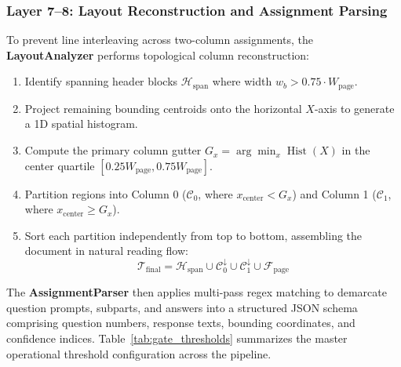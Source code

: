 \documentclass[journal]{IEEEtran}
\begin{document}
\subsubsection{Layer 7--8: Layout Reconstruction and Assignment Parsing}
To prevent line interleaving across two-column assignments, the \textbf{LayoutAnalyzer} performs topological column reconstruction:
\begin{enumerate}
    \item Identify spanning header blocks $\mathcal{H}_{\text{span}}$ where width $w_b > 0.75 \cdot W_{\text{page}}$.
    \item Project remaining bounding centroids onto the horizontal $X$-axis to generate a 1D spatial histogram.
    \item Compute the primary column gutter $G_x = \arg\min_x \operatorname{Hist}(X)$ in the center quartile $[0.25 W_{\text{page}}, 0.75 W_{\text{page}}]$.
    \item Partition regions into Column 0 ($\mathcal{C}_0$, where $x_{\text{center}} < G_x$) and Column 1 ($\mathcal{C}_1$, where $x_{\text{center}} \ge G_x$).
    \item Sort each partition independently from top to bottom, assembling the document in natural reading flow:
    \begin{equation}
        \mathcal{T}_{\text{final}} = \mathcal{H}_{\text{span}} \cup \mathcal{C}_0^{\downarrow} \cup \mathcal{C}_1^{\downarrow} \cup \mathcal{F}_{\text{page}}
    \end{equation}
\end{enumerate}
The \textbf{AssignmentParser} then applies multi-pass regex matching to demarcate question prompts, subparts, and answers into a structured JSON schema comprising question numbers, response texts, bounding coordinates, and confidence indices. Table~\ref{tab:gate_thresholds} summarizes the master operational threshold configuration across the pipeline.
\end{document}
